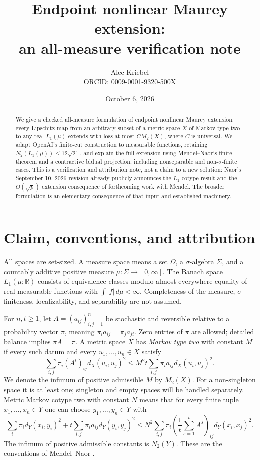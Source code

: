 \documentclass[11pt]{article}
\title{Endpoint nonlinear Maurey extension:\\an all-measure verification note}
\author{Alec Kriebel\\\small\href{https://orcid.org/0009-0001-9320-500X}{ORCID: 0009-0001-9320-500X}}
\date{October 6, 2026}
\newcommand{\R}{\mathbb R}
\newcommand{\1}{\mathbf1}
\begin{document}
\maketitle
\begin{abstract}
We give a checked all-measure formulation of endpoint nonlinear Maurey extension: every Lipschitz map from an arbitrary subset of a metric space $X$ of Markov type two to any real $L_1(\mu)$ extends with loss at most $C M_2(X)$, where $C$ is universal. We adapt OpenAI's finite-cut construction to measurable functions, retaining $N_2(L_1(\mu))\leq12\sqrt{21}$, and explain the full extension using Mendel--Naor's finite theorem and a contractive bidual projection, including nonseparable and non-$\sigma$-finite cases. This is a verification and attribution note, not a claim to a new solution: Naor's September 10, 2026 revision already publicly announces the $L_1$ cotype result and the $O(\sqrt p)$ extension consequence of forthcoming work with Mendel. The broader formulation is an elementary consequence of that input and established machinery.
\end{abstract}

\section{Claim, conventions, and attribution}
All spaces are set-sized. A measure space means a set $\Omega$, a $\sigma$-algebra $\Sigma$, and a countably additive positive measure $\mu:\Sigma\to[0,\infty]$. The Banach space $L_1(\mu;\R)$ consists of equivalence classes modulo almost-everywhere equality of real measurable functions with $\int|f|\,d\mu<\infty$. Completeness of the measure, $\sigma$-finiteness, localizability, and separability are not assumed.

For $n,t\geq1$, let $A=(a_{ij})_{i,j=1}^n$ be stochastic and reversible relative to a probability vector $\pi$, meaning $\pi_i a_{ij}=\pi_j a_{ji}$. Zero entries of $\pi$ are allowed; detailed balance implies $\pi A=\pi$. A metric space $X$ has \emph{Markov type two} with constant $M$ if every such datum and every $u_1,\dots,u_n\in X$ satisfy
\begin{equation}\label{eq:type}
 \sum_{i,j}\pi_i(A^t)_{ij}d_X(u_i,u_j)^2
 \leq M^2t\sum_{i,j}\pi_i a_{ij}d_X(u_i,u_j)^2.
\end{equation}
We denote the infimum of positive admissible $M$ by $M_2(X)$. For a non-singleton space it is at least one; singleton and empty spaces will be handled separately. Metric Markov cotype two with constant $N$ means that for every finite tuple $x_1,\dots,x_n\in Y$ one can choose $y_1,\dots,y_n\in Y$ with
\begin{equation}\label{eq:cotype}
 \sum_i\pi_i d_Y(x_i,y_i)^2+t\sum_{i,j}\pi_i a_{ij}d_Y(y_i,y_j)^2
 \leq N^2\sum_{i,j}\pi_i\left(\frac1t\sum_{s=1}^t A^s\right)_{ij}d_Y(x_i,x_j)^2.
\end{equation}
The infimum of positive admissible constants is $N_2(Y)$. These are the conventions of Mendel--Naor \cite[Definitions 1.1--1.2]{MN13}.
\end{document}

